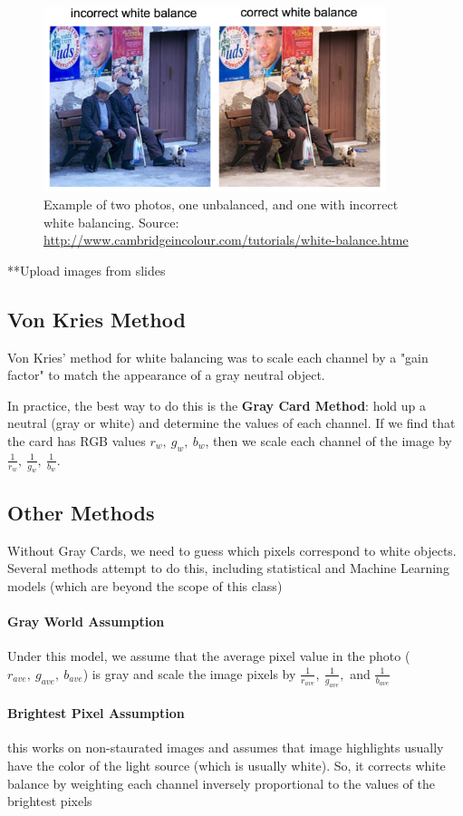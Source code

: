 \documentclass{article}
\begin{document}
\begin{figure}[h!]
\centering
\includegraphics[width=10cm]{wb.png}
\caption{Example of two photos, one unbalanced, and one with incorrect white balancing.  Source: \url{http://www.cambridgeincolour.com/tutorials/white-balance.htme}}
\end{figure}


**Upload images from slides
\subsection{Von Kries Method}
Von Kries' method for white balancing was to scale each channel by a "gain factor" to match the appearance of a gray neutral object.

In practice, the best way to do this is the \textbf{Gray Card Method}: hold up a neutral (gray or white) and determine the values of each channel.  If we find that the card has RGB values $r_w,\ g_w,\ b_w$, then we scale each channel of the image by $\frac{1}{r_w},\ \frac{1}{g_w},\ \frac{1}{b_w}$.

\subsection{Other Methods}
Without Gray Cards, we need to guess which pixels correspond to white objects.  Several methods attempt to do this, including statistical and Machine Learning models (which are beyond the scope of this class)

\paragraph{Gray World Assumption} Under this model, we assume that the average pixel value in the photo ($r_{ave},\ g_{ave},\ b_{ave}$) is gray and scale the image pixels by $\frac{1}{r_{ave}},\ \frac{1}{g_{ave}},$ and $\frac{1}{b_{ave}}$

\paragraph{Brightest Pixel Assumption} this works on non-staurated images and assumes that image highlights usually have the color of the light source (which is usually white).  So, it corrects white balance by weighting each channel inversely proportional to the values of the brightest pixels
\end{document}
